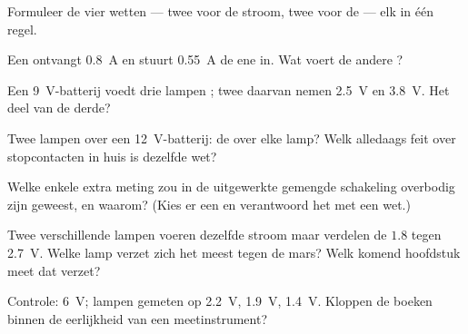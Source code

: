 \begin{exercise}[$\star$]\label{exo:g8:circuit-laws:1}
Formuleer de vier wetten --- twee voor de stroom, twee voor de
 --- elk in één regel.
\end{exercise}

\begin{exercise}[$\star$]\label{exo:g8:circuit-laws:2}
Een  ontvangt \qty{0.8}{A} en stuurt \qty{0.55}{A} de
ene  in. Wat voert de andere ?
\end{exercise}

\begin{exercise}[$\star$]\label{exo:g8:circuit-laws:3}
Een \qty{9}{V}-batterij voedt drie lampen ; twee daarvan
nemen \qty{2.5}{V} en \qty{3.8}{V}. Het deel van de derde?
\end{exercise}

\begin{exercise}[$\star$]\label{exo:g8:circuit-laws:4}
Twee lampen  over een \qty{12}{V}-batterij:
de  over elke lamp? Welk alledaags feit over
stopcontacten in huis is dezelfde wet?
\end{exercise}

\begin{exercise}[$\star$]\label{exo:g8:circuit-laws:5}
Welke enkele extra meting zou in de uitgewerkte gemengde schakeling
overbodig zijn geweest, en waarom? (Kies er een en verantwoord het met
een wet.)
\end{exercise}

\begin{exercise}[$\star$]\label{exo:g8:circuit-laws:6}
Twee verschillende lampen  voeren dezelfde stroom maar
verdelen de  $1.8$ tegen \qty{2.7}{V}. Welke lamp verzet
zich het meest tegen de mars? Welk komend hoofdstuk meet dat
verzet?
\end{exercise}

\begin{exercise}[$\star$]\label{exo:g8:circuit-laws:7}
Controle:  \qty{6}{V}; lampen  gemeten op
\qty{2.2}{V}, \qty{1.9}{V}, \qty{1.4}{V}. Kloppen de boeken binnen de
eerlijkheid van een meetinstrument?
\end{exercise}

